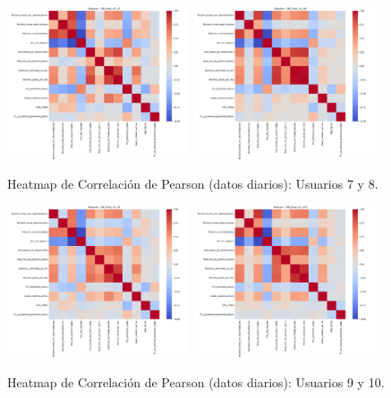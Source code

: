 \documentclass[12pt,letterpaper,twoside]{report}
\begin{document}
\begin{figure}[htbp]
\centering
\includegraphics[width=0.48\textwidth]{figuras/DB_final_v3_u7_heatmap_pearson.png}
\includegraphics[width=0.48\textwidth]{figuras/DB_final_v3_u8_heatmap_pearson.png}
\caption{Heatmap de Correlación de Pearson (datos diarios): Usuarios 7 y 8.}
\label{fig:corr_heatmap_u7_u8}
\end{figure}

\begin{figure}[htbp]
\centering
\includegraphics[width=0.48\textwidth]{figuras/DB_final_v3_u9_heatmap_pearson.png}
\includegraphics[width=0.48\textwidth]{figuras/DB_final_v3_u10_heatmap_pearson.png}
\caption{Heatmap de Correlación de Pearson (datos diarios): Usuarios 9 y 10.}
\label{fig:corr_heatmap_u9_u10}
\end{figure}
\end{document}
